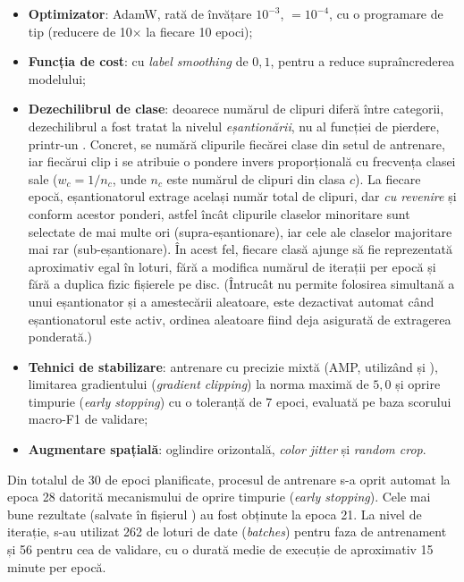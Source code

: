 \documentclass[../../main.tex]{subfiles}
\begin{document}
\begin{itemize}
    \item \textbf{Optimizator}: AdamW, rată de învățare $10^{-3}$, 
    $= 10^{-4}$, cu o programare de tip  (reducere de 10$\times$ la fiecare 10
    epoci);
    \item \textbf{Funcția de cost}:  cu \textit{label smoothing}
    de $0{,}1$, pentru a reduce supraîncrederea modelului;
    \item \textbf{Dezechilibrul de clase}: deoarece numărul de clipuri diferă între categorii,
    dezechilibrul a fost tratat la nivelul \textit{eșantionării}, nu al funcției de pierdere,
    printr-un . Concret, se numără clipurile fiecărei clase din
    setul de antrenare, iar fiecărui clip i se atribuie o pondere invers proporțională cu frecvența
    clasei sale ($w_c = 1 / n_c$, unde $n_c$ este numărul de clipuri din clasa $c$). La fiecare epocă,
    eșantionatorul extrage același număr total de clipuri, dar \textit{cu revenire} și conform acestor
    ponderi, astfel încât clipurile claselor minoritare sunt selectate de mai multe ori
    (supra-eșantionare), iar cele ale claselor majoritare mai rar (sub-eșantionare). În acest fel,
    fiecare clasă ajunge să fie reprezentată aproximativ egal în loturi, fără a modifica numărul de
    iterații per epocă și fără a duplica fizic fișierele pe disc. (Întrucât  nu
    permite folosirea simultană a unui eșantionator și a amestecării aleatoare, 
    este dezactivat automat când eșantionatorul este activ, ordinea aleatoare fiind deja asigurată de
    extragerea ponderată.)
    \item \textbf{Tehnici de stabilizare}: antrenare cu precizie mixtă (AMP, utilizând \linebreak {} și ), limitarea gradientului (\textit{gradient clipping}) la norma maximă de $5{,}0$ și oprire timpurie (\textit{early stopping}) cu o toleranță de 7 epoci, evaluată pe baza scorului macro-F1 de validare;
    \item \textbf{Augmentare spațială}: oglindire orizontală, \textit{color jitter} și
    \textit{random crop}.
\end{itemize}

Din totalul de 30 de epoci planificate, procesul de antrenare s-a oprit automat la epoca 28 datorită mecanismului de oprire timpurie (\textit{early stopping}). Cele mai bune rezultate (salvate în fișierul ) au fost obținute la epoca 21. La nivel de iterație, s-au utilizat 262 de loturi de date (\textit{batches}) pentru faza de antrenament și 56 pentru cea de validare, cu o durată medie de execuție de aproximativ 15 minute per epocă.
\end{document}
